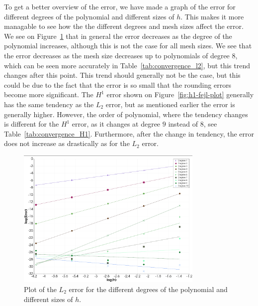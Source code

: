 To get a better overview of the error, we have made a graph of the error for different degrees of the polynomial and different sizes of $h$.
This makes it more managable to see how the the different degrees and mesh sizes affect the error. 
We see on Figure~\ref{fig:l2-fejl-plot} that in general the error decreases as the degree of the polynomial increases, although this is not the case for all mesh sizes.
We see that the error decreases as the mesh size decreases up to polynomials of degree $8$, which can be seen more accurately in Table~\ref{tab:convergence_l2}, but this trend changes after this point.
This trend should generally not be the case, but this could be due to the fact that the error is so small that the rounding errors become more significant.
The $H^1$ error shown on Figure~\ref{fig:h1-fejl-plot} generally has the same tendency as the $L_2$ error, but as mentioned earlier the error is generally higher.
However, the order of polynomial, where the tendency changes is different for the $H^1$ error, as it changes at degree $9$ instead of $8$, see Table~\ref{tab:convergence_H1}.
Furthermore, after the change in tendency, the error does not increase as drastically as for the $L_2$ error. 

\begin{figure}
    \begin{centering}
    \includegraphics[width=0.8\textwidth]{Afsnit/Application/figurer/l2-fejl-plot.jpeg}
    \caption{Plot of the $L_2$ error for the different degrees of the polynomial and different sizes of $h$.}
    \label{fig:l2-fejl-plot}
    \end{centering}
\end{figure}


